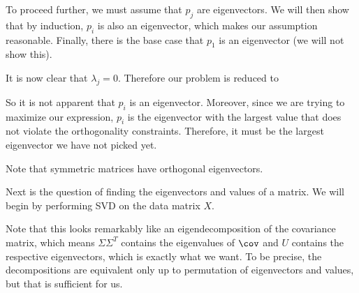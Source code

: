 \documentclass[12pt]{article}
\begin{document}

To proceed further, we must assume that $p_j$ are eigenvectors. We will then show that by induction, $p_i$ is also an eigenvector, which makes our assumption reasonable. Finally, there is the base case that $p_1$ is an eigenvector (we will not show this).


It is now clear that $\lambda_j = 0$. Therefore our problem is reduced to


So it is not apparent that $p_i$ is an eigenvector. Moreover, since we are trying to maximize our expression, $p_i$ is the eigenvector with the largest value that does not violate the orthogonality constraints. Therefore, it must be the largest eigenvector we have not picked yet.

Note that symmetric matrices have orthogonal eigenvectors. 

Next is the question of finding the eigenvectors and values of a matrix. We will begin by performing SVD on the data matrix $X$.


Note that this looks remarkably like an eigendecomposition of the covariance matrix, which means $\Sigma \Sigma^T$ contains the eigenvalues of $\cov$ and $U$ contains the respective eigenvectors, which is exactly what we want. To be precise, the decompositions are equivalent only up to permutation of eigenvectors and values, but that is sufficient for us.
\end{document}
